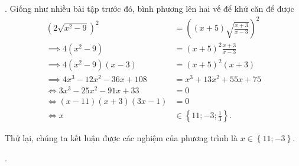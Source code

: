 . Giống như nhiều bài tập trước đó, bình phương lên hai vế để khử căn để được
\begin{align*}
   \left(2\sqrt{x^2 - 9}\right)^2 &= \left((x + 5)\sqrt{\frac{x+3}{x-3}}\right)^2 \\ 
   \implies 4\left(x^2-9\right) &= (x + 5)^2\frac{x+3}{x-3}\\
   \implies 4\left(x^2-9\right)(x - 3) &= (x + 5)^2(x + 3) \\
   \implies 4x^3 - 12x^2 - 36x + 108 &= x^3 + 13x^2 + 55x + 75 \\
   \iff 3x^3 - 25x^2 - 91x + 33 &= 0 \\
   \iff (x - 11)(x + 3)(3x - 1) &= 0 \\
   \iff x &\in \left\{11; -3; \frac{1}{3}\right\}.
\end{align*}

Thử lại, chúng ta kết luận được các nghiệm của phương trình là $x \in \left\{11; -3\right\}$.

. 
